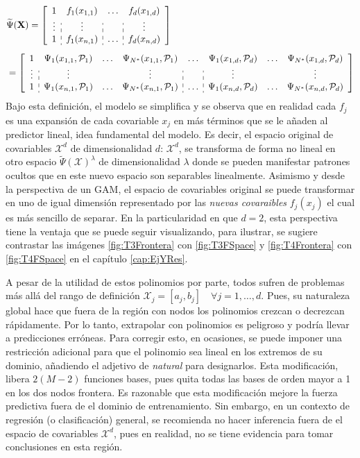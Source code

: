 \documentclass[../Main/Main.tex]{subfiles}
\begin{document}
\begin{align}
&\widetilde{\Psi}(\xmat) = 
\left[
\begin{array}{c:c:c:c}
1 & f_1(x_{1,1}) & \ldots & f_d(x_{1,d}) \\
\vdots & \vdots & ~ & \vdots \\
1 & f_1(x_{n,1}) & \ldots & f_d(x_{n,d}) 
\end{array} 
\right] \label{ec:PsiTilde}\\[5pt]
&=
\left[
\begin{array}{c:ccc:c:ccc}
1 & \Psi_1(x_{1,1},\P_1) & \ldots & \Psi_{\N}(x_{1,1},\P_1) & \ldots & \Psi_1(x_{1,d},\P_d) & \ldots & \Psi_{\N}(x_{1,d},\P_d)\\
\vdots & \vdots & ~ & \vdots & ~ & \vdots & ~ & \vdots \\
1 & \Psi_1(x_{n,1},\P_1) & \ldots & \Psi_{\N}(x_{n,1},\P_1) & \ldots & \Psi_1(x_{n,d},\P_d) & \ldots & \Psi_{\N}(x_{n,d},\P_d)
\end{array}
\right]\nonumber
\end{align}
Bajo esta definición, el modelo se simplifica y se observa que en realidad cada $f_j$ es una expansión de cada covariable $x_j$ en más términos que se le añaden al predictor lineal, idea fundamental del modelo. Es decir, el espacio original de covariables $\mathcal{X}^d$ de dimensionalidad $d$: $\mathcal{X}^d$, se transforma de forma no lineal en otro espacio $\widetilde{\Psi}(\mathcal{X})^{\lambda}$ de dimensionalidad $\lambda$ donde se pueden manifestar patrones ocultos que en este nuevo espacio son separables linealmente. Asimismo y desde la perspectiva de un GAM, el espacio de covariables original se puede transformar en uno de igual dimensión representado por las \textit{nuevas covaraibles} $f_j(x_j)$ el cual es más sencillo de separar. En la particularidad en que $d = 2$, esta perspectiva tiene la ventaja que se puede seguir visualizando, para ilustrar, se sugiere contrastar las imágenes \ref{fig:T3Frontera} con \ref{fig:T3FSpace} y \ref{fig:T4Frontera} con \ref{fig:T4FSpace} en el capítulo \ref{cap:EjYRes}. 

A pesar de la utilidad de estos polinomios por parte, todos sufren de problemas más allá del rango de definición $\mathcal{X}_j = [a_j,b_j] \quad \forall j = 1,\ldots,d$. Pues, su naturaleza global hace que fuera de la región con nodos los polinomios crezcan o decrezcan rápidamente. Por lo tanto, extrapolar con polinomios es peligroso y podría llevar a predicciones erróneas. Para corregir esto, en ocasiones, se puede imponer una restricción adicional para que el polinomio sea lineal en los extremos de su dominio, añadiendo el adjetivo de \textit{natural} para designarlos. Esta modificación, libera $2(M-2)$ funciones bases, pues quita todas las bases de orden mayor a 1 en los dos nodos frontera. Es razonable que esta modificación mejore la fuerza predictiva fuera de el dominio de entrenamiento. Sin embargo, en un contexto de regresión (o clasificación) general, se recomienda no hacer inferencia fuera de el espacio de covariables $\mathcal{X}^d$, pues en realidad, no se tiene evidencia para tomar conclusiones en esta región.
\end{document}
